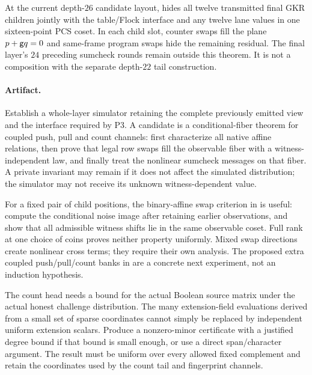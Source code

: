At the current depth-$26$ candidate layout,  hides all twelve transmitted final GKR children jointly with the table/Flock interface and any twelve lane values in one sixteen-point PCS coset. In each child slot, counter swaps fill the plane $p+\mathsf{g} q=0$ and same-frame program swaps hide the remaining residual. The final layer's $24$ preceding sumcheck rounds remain outside this theorem. It is not a composition with the separate depth-$22$ tail construction.

\paragraph{Artifact.} Establish a whole-layer simulator retaining the complete previously emitted view and the interface required by P3. A candidate is a conditional-fiber theorem for coupled push, pull and count channels: first characterize all native affine relations, then prove that legal row swaps fill the observable fiber with a witness-independent law, and finally treat the nonlinear sumcheck messages on that fiber. A private invariant may remain if it does not affect the simulated distribution; the simulator may not receive its unknown witness-dependent value.

For a fixed pair of child positions, the binary-affine swap criterion in  is useful: compute the conditional noise image after retaining earlier observations, and show that all admissible witness shifts lie in the same observable coset. Full rank at one choice of coins proves neither property uniformly. Mixed swap directions create nonlinear cross terms; they require their own analysis. The proposed extra coupled push/pull/count banks in  are a concrete next experiment, not an induction hypothesis.

The count head needs a bound for the actual Boolean source matrix under the actual honest challenge distribution. The many extension-field evaluations derived from a small set of sparse coordinates cannot simply be replaced by independent uniform extension scalars. Produce a nonzero-minor certificate with a justified degree bound if that bound is small enough, or use a direct span/character argument. The result must be uniform over every allowed fixed complement and retain the coordinates used by the count tail and fingerprint channels.


